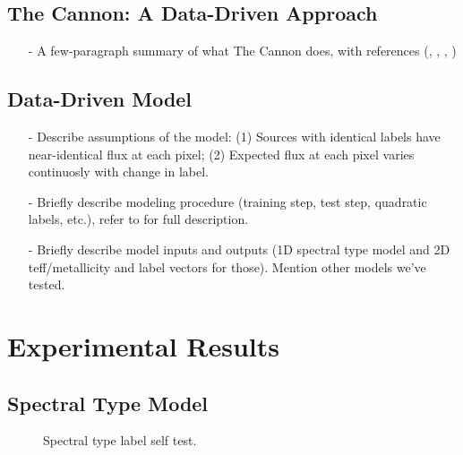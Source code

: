 \documentclass[modern]{aastex62}
\begin{document}
\subsection{The Cannon: A Data-Driven Approach}
\begin{enumerate}
\item[-] A few-paragraph summary of what The Cannon does, with references (\citealt{Ness:2015}, \citealt{Casey:2016}, \citealt{Ho:2017a}, \citealt{Ho:2017b})
\end{enumerate}

\subsection{Data-Driven Model}
\begin{enumerate}
\item[-] Describe assumptions of the model: (1) Sources with identical labels have near-identical flux at each pixel; (2) Expected flux at each pixel varies continuosly with change in label. 
\item[-] Briefly describe modeling procedure (training step, test step, quadratic labels, etc.), refer to \citealt{Ness:2015} for full description.
\item[-] Briefly describe model inputs and outputs (1D spectral type model and 2D teff/metallicity and label vectors for those). Mention other models we've tested.
\end{enumerate}


\section{Experimental Results} \label{sec:results}


\subsection{Spectral Type Model}
\begin{figure}[ht]
\caption{Spectral type label self test.}
\end{figure}
\end{document}
